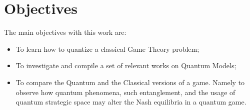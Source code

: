 \section{Objectives}
\label{sec:int_objectives}

The main objectives with this work are: 

\begin{itemize}
\item To learn how to quantize a classical Game Theory problem;

\item To investigate and compile a set of relevant works on Quantum Models;

\item To compare the Quantum and the Classical versions of a game. Namely to observe how quantum phenomena, such entanglement, and the usage of quantum strategic space may alter the Nash equilibria in a quantum game.

\end{itemize}